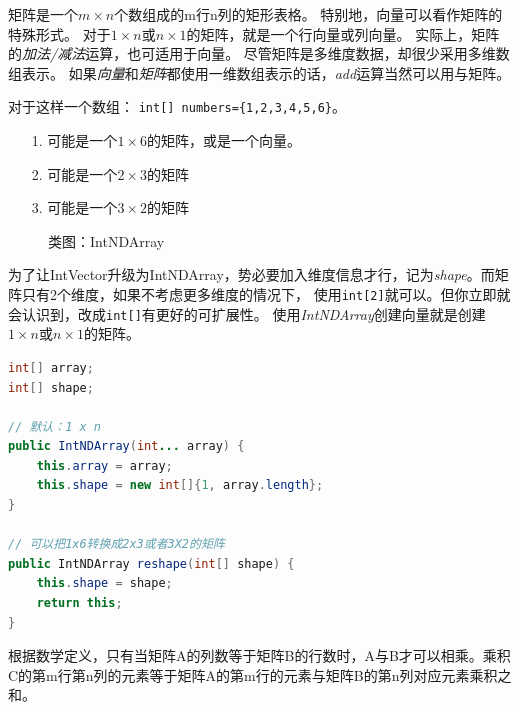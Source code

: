 矩阵是一个$m \times n$个数组成的m行n列的矩形表格。
特别地，向量可以看作矩阵的特殊形式。
对于$1 \times n$或$n \times 1$的矩阵，就是一个行向量或列向量。
实际上，矩阵的\emph{加法/减法}运算，也可适用于向量。
尽管矩阵是多维度数据，却很少采用多维数组表示。
如果\emph{向量}和\emph{矩阵}都使用一维数组表示的话，\emph{add}运算当然可以用与矩阵。

\vspace{0.3cm}\noindent
对于这样一个数组： \lstinline|int[] numbers={1,2,3,4,5,6}|。
\begin{itemize}
\item[1.] 可能是一个$1 \times 6$的矩阵，或是一个向量。
\item[2.] 可能是一个$2 \times 3$的矩阵
\item[3.] 可能是一个$3 \times 2$的矩阵
\end{itemize}

\begin{figure}[!htb]
\begin{center}\end{center}
\caption{类图：IntNDArray}
\end{figure}

为了让IntVector升级为IntNDArray，势必要加入维度信息才行，记为\emph{shape}。而矩阵只有2个维度，如果不考虑更多维度的情况下，
使用\lstinline|int[2]|就可以。但你立即就会认识到，改成\lstinline|int[]|有更好的可扩展性。
使用\emph{IntNDArray}创建向量就是创建$1 \times n$或$n \times 1$的矩阵。

\begin{lstlisting}[language=Java,caption={创建NDArray}]
int[] array;
int[] shape;

// 默认：1 x n
public IntNDArray(int... array) {
    this.array = array;
    this.shape = new int[]{1, array.length};
}

// 可以把1x6转换成2x3或者3X2的矩阵
public IntNDArray reshape(int[] shape) {
    this.shape = shape;
    return this;
}
\end{lstlisting}

根据数学定义，只有当矩阵A的列数等于矩阵B的行数时，A与B才可以相乘。乘积C的第m行第n列的元素等于矩阵A的第m行的元素与矩阵B的第n列对应元素乘积之和。

